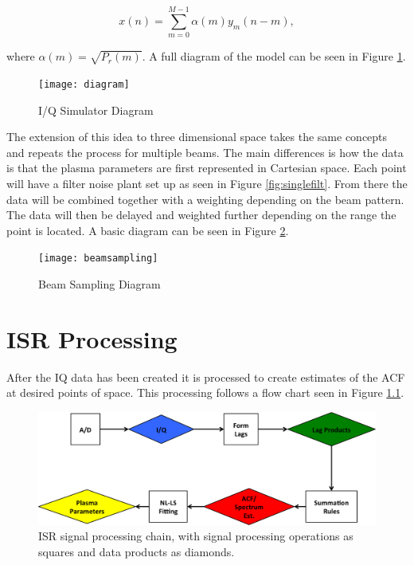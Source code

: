 \documentclass[10pt]{report}
\begin{document}
\begin{equation}
\label{eq4}
x(n) = \displaystyle\sum\limits_{m =0}^{M-1} \alpha(m)y_m(n-m),
\end{equation}

\noindent where $\alpha(m) = \sqrt{P_r(m)}$.  A full diagram of the model can be seen in Figure \ref{fig:sumrule}.

\begin{figure}[!t]
\centering
\texttt{[image: diagram]}
\caption{I/Q Simulator Diagram}
\label{fig:sumrule}
\end{figure}

The extension of this idea to three dimensional space takes the same concepts and repeats the process for multiple beams.  The main differences is how the data is that the plasma parameters are first represented in Cartesian space.  Each point will have a filter noise plant set up as seen in Figure \ref{fig:singlefilt}.  From there the data will be combined together with a weighting depending on the beam pattern.  The data will then be delayed and weighted further depending on the range the point is located.  A basic diagram can be seen in Figure \ref{fig:beamdia}.

\begin{figure}[!t]
\centering
\texttt{[image: beamsampling]}
\caption{Beam Sampling Diagram}
\label{fig:beamdia}
\end{figure}


\chapter{ISR Processing}

After the IQ data has been created it is processed to create estimates of the ACF at desired points of space. This processing follows a flow chart seen in Figure \ref{fig:chain}.

\begin{figure}[!t]
\centering
\includegraphics[width=6in]{datastackchain}
\caption{ISR signal processing chain, with signal processing operations as squares and data products as diamonds.}
\label{fig:chain}
\end{figure}
\end{document}

